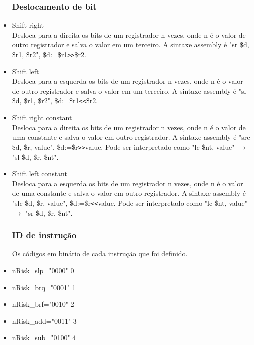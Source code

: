 \documentclass[a4paper, 10pt]{article}
\begin{document}
\begin{itemize}
	\subsubsection{Deslocamento de bit}
	\item Shift right\\
	Desloca para a direita os bits de um registrador n vezes, onde n é o valor de outro registrador e salva o valor em um terceiro. A sintaxe assembly é "sr \$d, \$r1, \$r2", \$d:=\$r1\texttt{>{}>}\$r2. 
	\item Shift left\\
	Desloca para a esquerda os bits de um registrador n vezes, onde n é o valor de outro registrador e salva o valor em um terceiro. A sintaxe assembly é "sl \$d, \$r1, \$r2", \$d:=\$r1\texttt{<{}<}\$r2.
	\item Shift right constant\\
	Desloca para a direita os bits de um registrador n vezes, onde n é o valor de uma constante e salva o valor em outro registrador. A sintaxe assembly é "src \$d, \$r, value", \$d:=\$r\texttt{>{}>}value. Pode ser interpretado como "lc \$nt, value" $\rightarrow$ "sl \$d, \$r, \$nt".
	\item Shift left constant\\
	Desloca para a esquerda os bits de um registrador n vezes, onde n é o valor de uma constante e salva o valor em outro registrador. A sintaxe assembly é "slc \$d, \$r, value", \$d:=\$r\texttt{<{}<}value. Pode ser interpretado como "lc \$nt, value" $\rightarrow$ "sr \$d, \$r, \$nt".
	
	\subsubsection{ID de instrução}
	Os códigos em binário de cada instrução que foi definido.
		\item nRisk\_slp="0000" 0\\
		
		\item nRisk\_brq="0001" 1\\
		
		\item nRisk\_brf="0010" 2\\
		
		\item nRisk\_add="0011" 3\\
		
		\item nRisk\_sub="0100" 4\\
		

\end{itemize}
\end{document}
